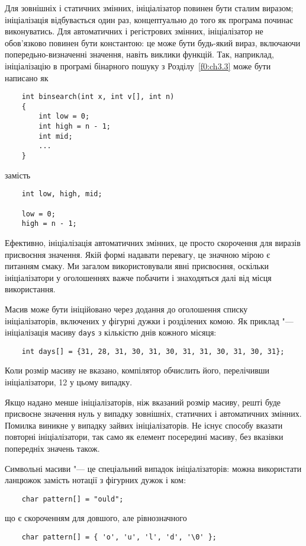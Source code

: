 \documentclass[a4paper,12pt]{book}
\begin{document}
  Для зовнішніх і статичних змінних, ініціалізатор повинен бути сталим виразом;
  ініціалізація відбувається один раз, концептуально до того як програма починає
  виконуватись. Для автоматичних і регістрових змінних, ініціалізатор не обов'язково
  повинен бути константою: це може бути будь-який вираз, включаючи попередьно-визначенні
  значення, навіть виклики функцій. Так, наприклад, ініціалізацію в програмі бінарного
  пошуку з Розділу~\ref{f0:ch3.3} може бути написано як
  \begin{verbatim}
    int binsearch(int x, int v[], int n)
    {
        int low = 0;
        int high = n - 1;
        int mid;
        ...
    }
  \end{verbatim}
  замість
  \begin{verbatim}
    int low, high, mid;

    low = 0;
    high = n - 1;
  \end{verbatim}

  Ефективно, ініціалізація автоматичних змінних, це просто скорочення для виразів
  присвоєння значення. Якій формі надавати перевагу, це значною мірою є питанням смаку.
  Ми загалом використовували явні присвоєння, оскільки ініціалізатори у оголошеннях важче
  побачити і знаходяться далі від місця використання.

  Масив може бути ініційовано через додання до оголошення списку ініціалізаторів,
  включених у фігурні дужки і розділених комою. Як приклад "--- ініціалізація масиву
  \texttt{days} з кількістю днів кожного місяця:
  \begin{verbatim}
    int days[] = {31, 28, 31, 30, 31, 30, 31, 31, 30, 31, 30, 31};
  \end{verbatim}

  Коли розмір масиву не вказано, компілятор обчислить його, перелічивши
  ініціалізатори, 12 у цьому випадку.

  Якщо надано менше ініціалізаторів, ніж вказаний розмір масиву, решті буде присвоєне
  значення нуль у випадку зовнішніх, статичних і автоматичних змінних. Помилка виникне у
  випадку зайвих ініціалізаторів. Не існує способу вказати повторні ініціалізатори, так
  само як елемент посередині масиву, без вказівки попередніх значень також.

  Символьні масиви "--- це спеціальний випадок ініціалізаторів: можна використати
  ланцюжок замість нотації з фігурних дужок і ком:
  \begin{verbatim}
    char pattern[] = "ould";
  \end{verbatim}
  що є скороченням для довшого, але рівнозначного
  \begin{verbatim}
    char pattern[] = { 'o', 'u', 'l', 'd', '\0' };
  \end{verbatim}
\end{document}
